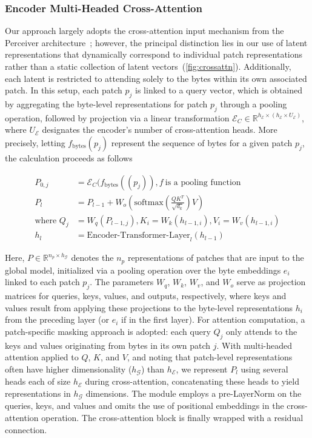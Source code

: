 \subsubsection{Encoder Multi-Headed Cross-Attention}
\label{sec:enc-cross-attn}
Our approach largely adopts the cross-attention input mechanism from the Perceiver architecture~\citep{jaegle2021perceiver}; however, the principal distinction lies in our use of latent representations that dynamically correspond to individual patch representations rather than a static collection of latent vectors~(\autoref{fig:crossattn}). Additionally, each latent is restricted to attending solely to the bytes within its own associated patch. In this setup, each patch $p_j$ is linked to a query vector, which is obtained by aggregating the byte-level representations for patch $p_j$ through a pooling operation, followed by projection via a linear transformation $\mathcal{E}_{C} \in \mathbb{R}^{h_{\mathcal{E}} \times (h_{\mathcal{E}} \times U_{\mathcal{E}})}$, where $U_{\mathcal{E}}$ designates the encoder’s number of cross-attention heads. More precisely, letting $f_{\text{bytes}}(p_j)$ represent the sequence of bytes for a given patch $p_j$, the calculation proceeds as follows

\begin{align}
P_{0,j} &= \mathcal{E}_{C}(f_\text{bytes}((p_j)), f~ \text{is a pooling function} \\
P_l &= P_{l-1} + W_o\left(\text{softmax}\left(\frac{QK^T}{\sqrt{d_k}}\right)V\right) \\
\text{where } Q_j &= W_q(P_{l-1,j}), K_i = W_k(h_{l-1,i}), V_i = W_v(h_{l-1,i}) \\
h_l &= \text{Encoder-Transformer-Layer}_l(h_{l-1})
\end{align}

Here, $P \in \mathbb{R}^{n_p \times h_{\mathcal{G}}}$ denotes the $n_p$ representations of patches that are input to the global model, initialized via a pooling operation over the byte embeddings $e_i$ linked to each patch $p_j$. The parameters $W_q$, $W_k$, $W_v$, and $W_o$ serve as projection matrices for queries, keys, values, and outputs, respectively, where keys and values result from applying these projections to the byte-level representations $h_i$ from the preceding layer (or $e_i$ if in the first layer). For attention computation, a patch-specific masking approach is adopted: each query $Q_j$ only attends to the keys and values originating from bytes in its own patch $j$. With multi-headed attention applied to $Q$, $K$, and $V$, and noting that patch-level representations often have higher dimensionality ($h_{\mathcal{G}}$) than $h_{\mathcal{E}}$, we represent $P_l$ using several heads each of size $h_{\mathcal{E}}$ during cross-attention, concatenating these heads to yield representations in $h_{\mathcal{G}}$ dimensions. The module employs a pre-LayerNorm on the queries, keys, and values and omits the use of positional embeddings in the cross-attention operation. The cross-attention block is finally wrapped with a residual connection.

